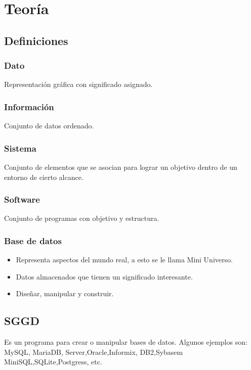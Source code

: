 \documentclass[12pt, fleqn]{report}                             %
\theoremstyle{break}                                            %
\begin{document}
	
	
    \clearpage
	\tableofcontents{}
	\label{sec:Index}

	\clearpage



    \chapter{Teoría}
    \section{Definiciones}

	    \subsection{Dato}
	    	Representación gráfica con significado asignado.
	    \subsection{Información}
	    	Conjunto de datos ordenado.
	    \subsection{Sistema}
	    	Conjunto de elementos que se asocian para lograr un objetivo dentro de un entorno de cierto alcance.
	    \subsection{Software}
	    	Conjunto de programas con objetivo y estructura.
	    \subsection{Base de datos}
	    	\begin{itemize}
	    		\item Representa aspectos del mundo real, a esto se le llama Mini Universo.
	    		\item Datos almacenados que tienen un significado interesante.
	    		\item Diseñar, manipular y construir.
	    	\end{itemize}

	    	

    \section{SGGD}
    Es un programa para crear o manipular bases de datos. Algunos ejemplos son: MySQL, MariaDB, Server,Oracle,Informix, DB2,Sybasem MiniSQL,SQLite,Postgress, etc.
\end{document}
